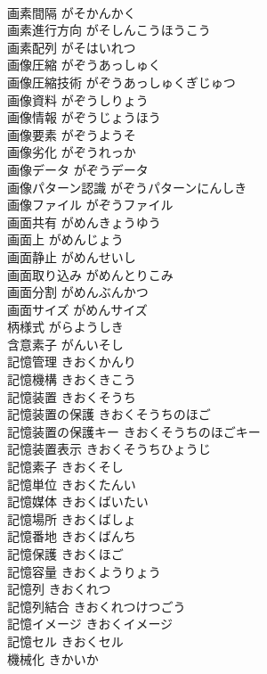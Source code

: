 \documentclass[8pt]{extreport}
\begin{document}
\begin{CJK}{UTF8}{min}
\\	画素間隔	がそかんかく	
\\	画素進行方向	がそしんこうほうこう	
\\	画素配列	がそはいれつ	
\\	画像圧縮	がぞうあっしゅく	
\\	画像圧縮技術	がぞうあっしゅくぎじゅつ	
\\	画像資料	がぞうしりょう	
\\	画像情報	がぞうじょうほう	
\\	画像要素	がぞうようそ	
\\	画像劣化	がぞうれっか	
\\	画像データ	がぞうデータ	
\\	画像パターン認識	がぞうパターンにんしき	
\\	画像ファイル	がぞうファイル	
\\	画面共有	がめんきょうゆう	
\\	画面上	がめんじょう	
\\	画面静止	がめんせいし	
\\	画面取り込み	がめんとりこみ	
\\	画面分割	がめんぶんかつ	
\\	画面サイズ	がめんサイズ	
\\	柄様式	がらようしき	
\\	含意素子	がんいそし	
\\	記憶管理	きおくかんり	
\\	記憶機構	きおくきこう	
\\	記憶装置	きおくそうち	
\\	記憶装置の保護	きおくそうちのほご	
\\	記憶装置の保護キー	きおくそうちのほごキー	
\\	記憶装置表示	きおくそうちひょうじ	
\\	記憶素子	きおくそし	
\\	記憶単位	きおくたんい	
\\	記憶媒体	きおくばいたい	
\\	記憶場所	きおくばしょ	
\\	記憶番地	きおくばんち	
\\	記憶保護	きおくほご	
\\	記憶容量	きおくようりょう	
\\	記憶列	きおくれつ	
\\	記憶列結合	きおくれつけつごう	
\\	記憶イメージ	きおくイメージ	
\\	記憶セル	きおくセル	
\\	機械化	きかいか	

\end{CJK}
\end{document}
